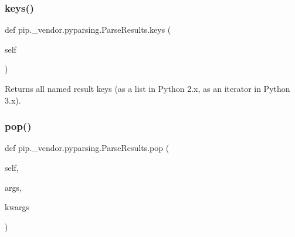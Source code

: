 \subsubsection{\texorpdfstring{keys()}{keys()}}
{\footnotesize\ttfamily def pip.\+\_\+vendor.\+pyparsing.\+Parse\+Results.\+keys (\begin{DoxyParamCaption}\item[{}]{self }\end{DoxyParamCaption})}

\begin{DoxyVerb}Returns all named result keys (as a list in Python 2.x, as an iterator in Python 3.x).\end{DoxyVerb}
 \mbox{\label{classpip_1_1__vendor_1_1pyparsing_1_1ParseResults_a09dcb25b39f7a1434cef2703a625dcba}} 
\subsubsection{\texorpdfstring{pop()}{pop()}}
{\footnotesize\ttfamily def pip.\+\_\+vendor.\+pyparsing.\+Parse\+Results.\+pop (\begin{DoxyParamCaption}\item[{}]{self,  }\item[{}]{args,  }\item[{}]{kwargs }\end{DoxyParamCaption})}

